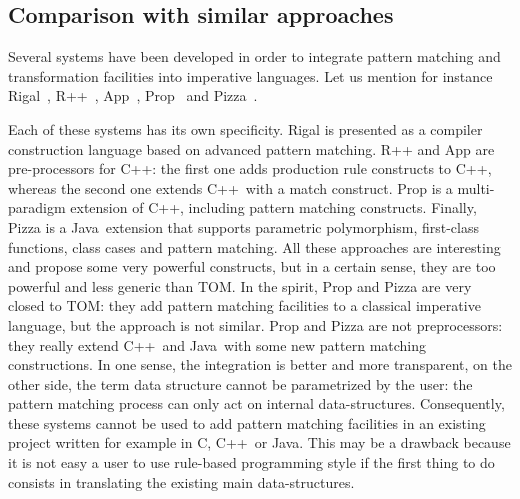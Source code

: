 \documentclass[a4paper]{article}
\newcommand{\TOM}{\textsf{TOM}}
\newcommand{\C}{\textsf{C}}
\newcommand{\Cplusplus}{\textsf{C++}}
\newcommand{\Java}{\textsf{Java}}
\begin{document}


\subsection{Comparison with similar approaches}
Several systems have been developed in order to integrate pattern
matching and transformation facilities into imperative languages. 
Let us mention for instance \textsf{Rigal}~\cite{AugustonMi1990a,Rigal},
\textsf{R++}~\cite{CrawfordDLMP-AAAI96,Rpp}, 
\textsf{App}~\cite{App}, \textsf{Prop}~\cite{Prop} and
\textsf{Pizza}~\cite{}. 

Each of these systems has its own specificity. 
\textsf{Rigal} is presented as
a compiler construction language based on advanced pattern matching.
\textsf{R++} and \textsf{App} are pre-processors for \Cplusplus: the first
one adds production rule constructs to \Cplusplus, whereas the second one
extends \Cplusplus\ with a match construct. \textsf{Prop} is a multi-paradigm
extension of \Cplusplus, including pattern matching constructs.
Finally, \textsf{Pizza} is a \Java\ extension that supports 
parametric polymorphism, first-class functions, class cases and
pattern matching. 
All these approaches are interesting and propose some very powerful
constructs, but in a certain sense, they are too powerful and less
generic than \TOM. 
In the spirit, \textsf{Prop} and \textsf{Pizza} are very closed to
\TOM: they add pattern matching facilities to a classical imperative
language, but the approach is not similar.
\textsf{Prop} and \textsf{Pizza} are not preprocessors: they really
extend \Cplusplus\ and \Java\ with some new pattern matching
constructions. In one sense, the integration is better and more
transparent, on the other side, the term data structure cannot be
parametrized by the user: the pattern matching process can only act on 
internal data-structures.  
Consequently, these systems cannot be used to add pattern matching
facilities in an existing project written for example in \C,
\Cplusplus\ or \Java. This may be a drawback because it is not easy a
user to use rule-based programming style if the first thing to do
consists in translating the existing main data-structures.


\end{document}
